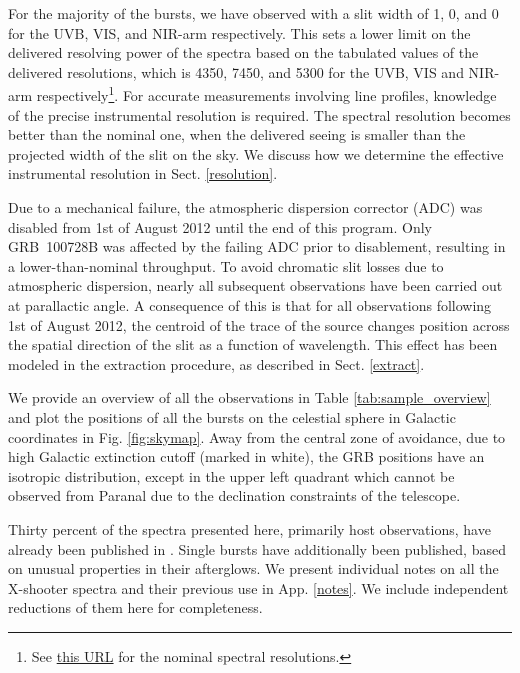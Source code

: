 \documentclass[longauth]{aa}    %
\begin{document}
For the majority of the bursts, we have observed with a slit width of 1,
0, and 0 for the UVB, VIS, and NIR-arm respectively. This sets a
lower limit on the delivered resolving power of the spectra based on the
tabulated values of the delivered resolutions, which is 4350, 7450, and 5300 for
the UVB, VIS and NIR-arm respectively\footnote{See
	\href{https://www.eso.org/sci/facilities/paranal/instruments/xshooter/inst.html}{this URL} for the nominal spectral resolutions.}. 
For accurate measurements involving line profiles, knowledge of the precise
instrumental resolution is required. The spectral resolution becomes better than
the nominal one, when the delivered seeing is smaller than the projected width
of the slit on the sky. We discuss how we determine the effective instrumental
resolution in Sect. \ref{resolution}.

Due to a mechanical failure, the atmospheric dispersion corrector (ADC) was
disabled from 1st of August 2012 until the end of this program. Only GRB~100728B
was affected by the failing ADC prior to disablement, resulting in a
lower-than-nominal throughput. To avoid chromatic slit losses due to atmospheric
dispersion, nearly all subsequent observations have been carried out at
parallactic angle. A consequence of this is that for all observations following
1st of August 2012, the centroid of the trace of the source changes position
across the spatial direction of the slit as a function of wavelength. This
effect has been modeled in the extraction procedure, as described in Sect.
\ref{extract}.



We provide an overview of all the observations in Table
\ref{tab:sample_overview} and plot the positions of all the bursts on the
celestial sphere in Galactic coordinates in Fig. \ref{fig:skymap}. Away from the
central zone of avoidance, due to high Galactic extinction cutoff (marked in
white), the GRB positions have an isotropic distribution, except in the upper
left quadrant which cannot be observed from Paranal due to the declination
constraints of the telescope.

Thirty percent of the spectra presented here, primarily host observations, have
already been published in \citet{Kruhler2015}. Single bursts have additionally
been published, based on unusual properties in their afterglows. We present
individual notes on all the X-shooter spectra and their previous use in App.
\ref{notes}. We include independent reductions of them here for completeness.
\end{document}
